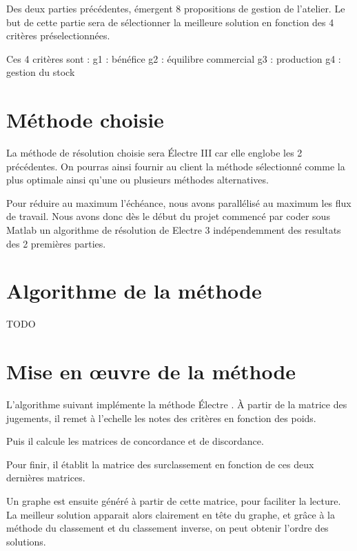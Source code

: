 
Des deux parties précédentes, émergent 8 propositions de gestion de l'atelier.
Le but de cette partie sera de sélectionner la meilleure solution en fonction des 4 critères préselectionnées.

Ces 4 critères sont :
g1 : bénéfice
g2 : équilibre commercial
g3 : production
g4 : gestion du stock

\section{Méthode choisie}

La méthode de résolution choisie sera Électre III car elle englobe les 2 précédentes.
On pourras ainsi fournir au client la méthode sélectionné comme la plus optimale ainsi qu'une ou plusieurs méthodes alternatives.

Pour réduire au maximum l'échéance, nous avons parallélisé au maximum les flux de travail.
Nous avons donc dès le début du projet commencé par coder sous Matlab un algorithme de résolution de Electre 3 indépendemment des resultats des 2 premières parties.

\section{Algorithme de la méthode}

TODO

\section{Mise en œuvre de la méthode}
L'algorithme suivant implémente la méthode Électre . À partir de la matrice des jugements, il remet à l'echelle les notes des critères en fonction des poids.


Puis il calcule les matrices de concordance et de discordance.



Pour finir, il établit la matrice des surclassement en fonction de ces deux dernières matrices.


Un graphe est ensuite généré à partir de cette matrice, pour faciliter la lecture.
La meilleur solution apparait alors clairement en tête du graphe, et grâce à la méthode du classement et du classement inverse, on peut obtenir l'ordre des solutions.

